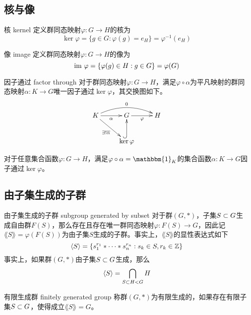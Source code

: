 \subsection{核与像}

\begin{definition}{核 kernel}
	定义群同态映射$\varphi:G\to H$的核为
	$$
	\ker\varphi=\{ g\in G:\varphi(g)=e_H \}=\varphi^{-1}(e_H)
	$$
\end{definition}

\begin{definition}{像 image}
	定义群同态映射$\varphi:G\to H$的像为
	$$
	\text{im } \varphi=\{ \varphi(g)\in H:g\in G \}=\varphi(G)
	$$
\end{definition}

\begin{proposition}{因子通过 factor through}
	对于群同态映射$\varphi:G\to H$，满足$\varphi\circ\alpha$为平凡映射的群同态映射$\alpha:K\to G$唯一因子通过$\ker\varphi$，其交换图如下。
	$$
	\xymatrix{
		K \ar[r]_{\alpha} \ar[dr]_{\exists!\overline{\alpha}} \ar@/^1pc/[rr]^0 &G \ar[r]_{\varphi} &H\\
		&\ker\varphi \ar@{^{(}->}[u]
	}
	$$
\end{proposition}

\begin{proposition}
	对于任意集合函数$\varphi:G\to H$，满足$\varphi\circ\alpha=\mathbbm{1}_{K}$的集合函数$\alpha:K\to G$因子通过$\ker\varphi$。
\end{proposition}

\subsection{由子集生成的子群}

\begin{definition}{由子集生成的子群 subgroup generated by subset}
	对于群$(G,*)$，子集$S\subset G$生成自由群$F(S)$，那么存在且存在唯一群同态映射$\varphi:F(S)\to G$，因此记$\lang S \rang=\varphi(F(S))$为由子集$S$生成的子群。事实上，$\lang S \rang$的显性表达式如下
	$$
	\langle S \rangle=\{ s_1^{r_1}*\cdots*s_n^{r_n}:s_k\in S,r_k\in\mathbb{Z} \}
	$$
	事实上，如果群$(G,*)$由子集$S\subset G$生成，那么
	$$
	\langle S \rangle=\bigcap_{S\subset H< G}H
	$$
\end{definition}

\begin{definition}{有限生成群 finitely generated group}
	称群$(G,*)$为有限生成的，如果存在有限子集$S\subset G$，使得成立$\lang S \rang=G$。
\end{definition}

